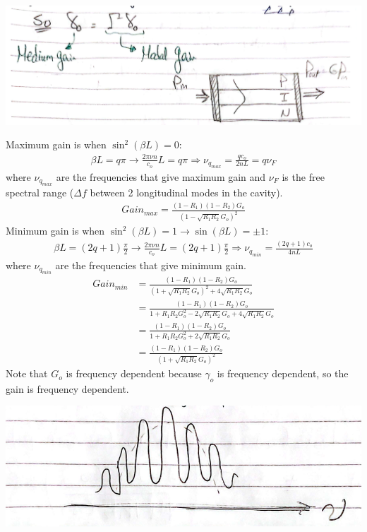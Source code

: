 \documentclass[11pt]{article}
\begin{document}
\begin{center}
    \includegraphics[scale=0.4]{2.png}
\end{center}
Maximum gain is when $\sin^2(\beta L) = 0$:
\begin{align*}
    \beta L = q \pi \rightarrow \frac{2 \pi \nu n}{c_o} L = q \pi \Rightarrow \nu_{q_{max}} = \frac{q c_o}{2 n L} = q \nu_F 
\end{align*}
where $\nu_{q_{max}}$ are the frequencies that give maximum gain and $\nu_F$ is the free spectral range ($\Delta f$ between 2 longitudinal modes in the cavity).
\begin{align*}
    Gain_{max} = \frac{(1-R_1) (1-R_2) G_o}{(1 - \sqrt{R_1 R_2} G_o)^2}
\end{align*}
Minimum gain is when $\sin^2(\beta L) = 1 \rightarrow \sin(\beta L) = \pm 1$:
\begin{align*}
    \beta L = \left(2q + 1\right) \frac{\pi}{2} \rightarrow \frac{2 \pi \nu n}{c_o} L = \left(2q + 1\right) \frac{\pi}{2} \Rightarrow \nu_{q_{min}} = \frac{\left(2q + 1\right) c_o}{4 n L}
\end{align*}
where $\nu_{q_{min}}$ are the frequencies that give minimum gain.
\begin{align*}
    Gain_{min} &= \frac{(1-R_1) (1-R_2) G_o}{(1 + \sqrt{R_1 R_2} G_o)^2 + 4 \sqrt{R_1 R_2} G_o} \\
    &= \frac{(1-R_1) (1-R_2) G_o}{1 + R_1 R_2 G_o^2 - 2 \sqrt{R_1 R_2} G_o + 4 \sqrt{R_1 R_2} G_o} \\
    &= \frac{(1-R_1) (1-R_2) G_o}{1 + R_1 R_2 G_o^2 + 2 \sqrt{R_1 R_2} G_o} \\
    &= \frac{(1-R_1) (1-R_2) G_o}{(1 + \sqrt{R_1 R_2} G_o)^2}
\end{align*}
Note that $G_o$ is frequency dependent because $\gamma_o$ is frequency dependent, so the gain is frequency dependent.
\begin{center}
    \includegraphics[scale=0.8]{3.png}
\end{center}
\end{document}
